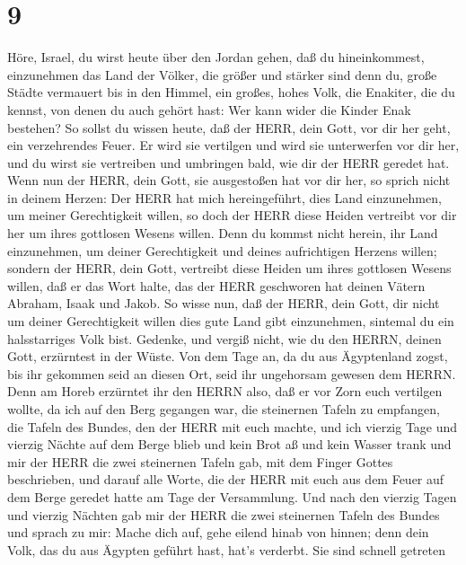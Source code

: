 \hypertarget{section-8}{%
\section{9}\label{section-8}}

 Höre, Israel, du wirst heute über den Jordan gehen, daß du
hineinkommest, einzunehmen das Land der Völker, die größer und stärker
sind denn du, große Städte vermauert bis in den Himmel,  ein
großes, hohes Volk, die Enakiter, die du kennst, von denen du auch
gehört hast: Wer kann wider die Kinder Enak bestehen?  So
sollst du wissen heute, daß der HERR, dein Gott, vor dir her geht, ein
verzehrendes Feuer. Er wird sie vertilgen und wird sie unterwerfen vor
dir her, und du wirst sie vertreiben und umbringen bald, wie dir der
HERR geredet hat.  Wenn nun der HERR, dein Gott, sie
ausgestoßen hat vor dir her, so sprich nicht in deinem Herzen: Der HERR
hat mich hereingeführt, dies Land einzunehmen, um meiner Gerechtigkeit
willen, so doch der HERR diese Heiden vertreibt vor dir her um ihres
gottlosen Wesens willen.  Denn du kommst nicht herein, ihr
Land einzunehmen, um deiner Gerechtigkeit und deines aufrichtigen
Herzens willen; sondern der HERR, dein Gott, vertreibt diese Heiden um
ihres gottlosen Wesens willen, daß er das Wort halte, das der HERR
geschworen hat deinen Vätern Abraham, Isaak und Jakob.  So
wisse nun, daß der HERR, dein Gott, dir nicht um deiner Gerechtigkeit
willen dies gute Land gibt einzunehmen, sintemal du ein halsstarriges
Volk bist.  Gedenke, und vergiß nicht, wie du den HERRN,
deinen Gott, erzürntest in der Wüste. Von dem Tage an, da du aus
Ägyptenland zogst, bis ihr gekommen seid an diesen Ort, seid ihr
ungehorsam gewesen dem HERRN.  Denn am Horeb erzürntet ihr
den HERRN also, daß er vor Zorn euch vertilgen wollte,  da
ich auf den Berg gegangen war, die steinernen Tafeln zu empfangen, die
Tafeln des Bundes, den der HERR mit euch machte, und ich vierzig Tage
und vierzig Nächte auf dem Berge blieb und kein Brot aß und kein Wasser
trank  und mir der HERR die zwei steinernen Tafeln gab, mit
dem Finger Gottes beschrieben, und darauf alle Worte, die der HERR mit
euch aus dem Feuer auf dem Berge geredet hatte am Tage der Versammlung.
 Und nach den vierzig Tagen und vierzig Nächten gab mir der
HERR die zwei steinernen Tafeln des Bundes  und sprach zu
mir: Mache dich auf, gehe eilend hinab von hinnen; denn dein Volk, das
du aus Ägypten geführt hast, hat's verderbt. Sie sind schnell getreten

